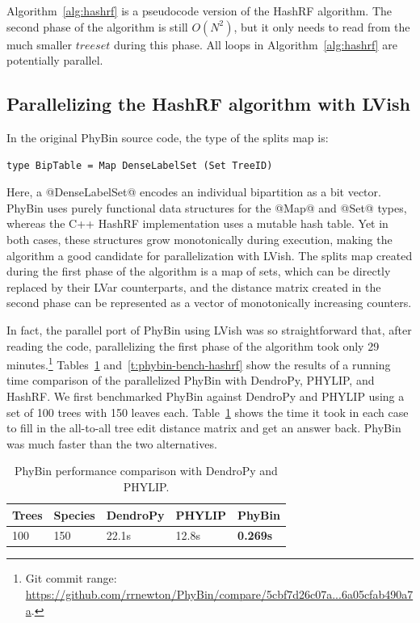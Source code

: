 Algorithm~\ref{alg:hashrf} is a pseudocode version of the HashRF
algorithm.  The second phase of the algorithm is still $O(N^2)$, but
it only needs to read from the much smaller $\mathit{treeset}$ during
this phase.  All loops in Algorithm~\ref{alg:hashrf} are potentially
parallel.

\subsection{Parallelizing the HashRF algorithm with LVish}

In the original PhyBin source code, the type of the splits map is:

\singlespacing
\begin{lstlisting}
type BipTable = Map DenseLabelSet (Set TreeID)
\end{lstlisting}
\doublespacing

\noindent Here, a @DenseLabelSet@ encodes an individual bipartition as
a bit vector.  PhyBin uses purely functional data structures for the
@Map@ and @Set@ types, whereas the C++ HashRF implementation uses a
mutable hash table.  Yet in both cases, these structures grow
monotonically during execution, making the algorithm a good candidate
for parallelization with LVish.  The splits map created during the
first phase of the algorithm is a map of sets, which can be directly
replaced by their LVar counterparts, and the distance matrix created
in the second phase can be represented as a vector of monotonically
increasing counters.

In fact, the parallel port of PhyBin using LVish was so
straightforward that, after reading the code, parallelizing the first
phase of the algorithm took only 29 minutes.\footnote{Git commit
  range:
  \url{https://github.com/rrnewton/PhyBin/compare/5cbf7d26c07a...6a05cfab490a7a}.}
Tables~\ref{t:phybin-bench} and~\ref{t:phybin-bench-hashrf} show the
results of a running time comparison of the parallelized PhyBin with
DendroPy, PHYLIP, and HashRF.  We first benchmarked PhyBin against
DendroPy and PHYLIP using a set of 100 trees with 150 leaves each.
Table~\ref{t:phybin-bench} shows the time it took in each case to fill
in the all-to-all tree edit distance matrix and get an answer back.
PhyBin was much faster than the two alternatives.

\begin{table}
\begin{tabularx}{.75\textwidth}{XXXXX}
Trees & Species & DendroPy & PHYLIP & PhyBin    \\ \hline
100   & 150     & 22.1s    & 12.8s  & \textbf{0.269s}
\end{tabularx}
\caption{PhyBin performance comparison with DendroPy and PHYLIP.}
\label{t:phybin-bench}
\end{table}

